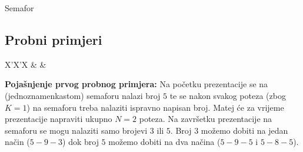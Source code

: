\begin{statement}[
  problempoints=100,
  timelimit=4 sekunde,
  memorylimit=512 MiB,
]{Semafor}
\subsection*{Probni primjeri}
\begin{tabularx}{\textwidth}{X'X'X}
 &
 &
\end{tabularx}

\textbf{Pojašnjenje prvog probnog primjera:}
Na početku prezentacije se na (jednoznamenkastom) semaforu nalazi broj $5$ te se
nakon svakog poteza (zbog $K = 1$) na semaforu treba nalaziti ispravno
napisan broj. Matej će za vrijeme prezentacije napraviti ukupno $N=2$ poteza.
Na završetku prezentacije na semaforu se mogu nalaziti samo brojevi $3$ ili
$5$.  Broj $3$ možemo dobiti na jedan način ($5-9-3$) dok broj $5$ možemo
dobiti na dva načina ($5-9-5$ i $5-8-5$).

\end{statement}

